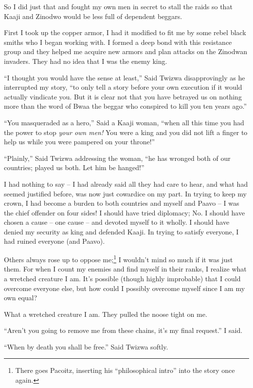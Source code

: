 So I did just that and fought my own men in secret to stall the raids so that Kaaji and Zinodwo would be less full of dependent beggars.

First I took up the copper armor, I had it modified to fit me by some rebel black smiths who I began working with. I formed a deep bond with this resistance group and they helped me acquire new armors and plan attacks on the Zinodwan invaders. They had no idea that I was the enemy king.

\tbreak

``I thought you would have the sense at least,'' Said Twizwa disapprovingly as he interrupted my story, ``to only tell a story before your own execution if it would actually vindicate you. But it is clear not that you have betrayed us on nothing more than the word of Bwaa the beggar who conspired to kill you ten years ago.''

``You masqueraded as a hero,'' Said a Kaaji woman, ``when all this time you had the power to stop \emph{your own men!} You were a king and you did not lift a finger to help us while you were pampered on your throne!''

``Plainly,'' Said Twizwa addressing the woman, ``he has wronged both of our countries; played us both. Let him be hanged!''

I had nothing to say -- I had already said all they had care to hear, and what had seemed justified before, was now just cowardice on my part. In trying to keep my crown, I had become a burden to both countries and myself and Paavo -- I was the chief offender on four sides! I should have tried diplomacy; No. I should have chosen a cause -- one cause -- and devoted myself to it wholly. I should have denied my security as king and defended Kaaji. In trying to satisfy everyone, I had ruined everyone (and Paavo).

Others always rose up to oppose me;\footnote{There goes Pacoitz, inserting his ``philosophical intro'' into the story once again.}
I wouldn't mind so much if it was just them.
For when I count my enemies and find myself in their ranks, I realize what a wretched creature I am.
It's possible (though highly improbable) that I could overcome everyone else, but how could I possibly overcome myself since I am my own equal?

What a wretched creature I am. They pulled the noose tight on me.

``Aren't you going to remove me from these chains, it's my final request.'' I said.

``When by death you shall be free.'' Said Twizwa softly.

